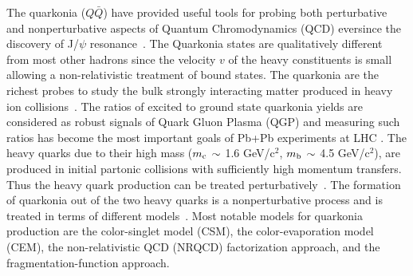 \documentclass[12pt,a4paper,final]{iopart}
\begin{document}
 The quarkonia ($Q\bar Q$) have provided useful tools for probing both 
perturbative and nonperturbative aspects of Quantum Chromodynamics (QCD) 
eversince the discovery of J/$\psi$ resonance~\cite{Augustin:1974xw,Aubert:1974js}. 
 The Quarkonia states are qualitatively different from most other hadrons since 
the velocity $v$ of the heavy constituents is small allowing a 
non-relativistic treatment of bound states. 
  The quarkonia are the richest probes to study the bulk strongly interacting matter
produced in heavy ion collisions~\cite{Kumar:2014kfa}. The ratios of excited to ground state 
quarkonia yields are considered as robust signals of Quark Gluon Plasma (QGP) and
measuring such ratios has become the most important goals of Pb+Pb experiments
at LHC \cite{Chatrchyan:2012lxa,Khachatryan:2014bva}.
  The heavy quarks due to their high mass 
($m_{\rm c}\,\sim$ 1.6 GeV/c$^2$, $m_{\rm b}\,\sim$ 4.5 GeV/c$^2$), 
are produced in initial partonic collisions with sufficiently high momentum 
transfers. Thus the heavy quark production can be treated 
perturbatively~\cite{Nason:1987xz,Nason:1989zy}.
  The formation of quarkonia out of the two heavy quarks is a nonperturbative 
process and is treated in terms of different 
models~\cite{Bodwin:1994jh,Brambilla:2010cs,Brambilla:2014jmp}. 
  Most notable models for quarkonia production are the color-singlet
model (CSM), the color-evaporation model (CEM), the non-relativistic QCD
(NRQCD) factorization approach, and the fragmentation-function approach.
\end{document}
